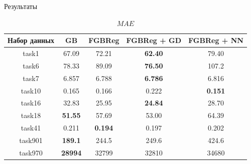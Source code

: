 \documentclass{beamer}
\begin{document}
\begin{frame}{Результаты}

\begin{table}[H]
\centering
\begin{tabular}{|c|c|c|c|c|}
    \hline
     Набор данных & GB              & FGBReg           & FGBReg + GD    & FGBReg + NN     \\
    \hline
    task1         & 67.09           & 72.21           & \textbf{62.40}  & 79.40           \\
    task6         & 78.33           & 89.09           & \textbf{76.50}  & 107.2           \\
    task7         & 6.857           & 6.788           & \textbf{6.786}  & 6.816           \\
    \hline
    task10        & 0.165           & 0.166           & 0.222           & \textbf{0.151}  \\
    task16        & 32.83           & 25.95           & \textbf{24.84}  & 28.70           \\
    task18        & \textbf{51.55}  & 57.69           & 53.00           & 64.39           \\
    \hline
    task41        & 0.211           & \textbf{0.194}  & 0.197           & 0.202           \\
    task901       & \textbf{189.1}  & 244.5           & 249.6           & 424.6           \\
    task970       & \textbf{28994}  & 32799           & 32810           & 34680           \\
    \hline
\end{tabular}
\caption{$MAE$}
\label{tab:mae_results}
\end{table}
    
\end{frame}
\end{document}
